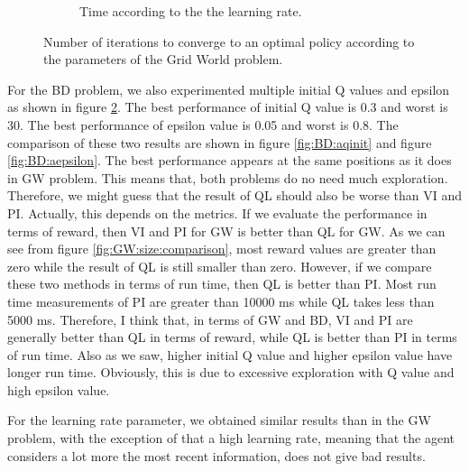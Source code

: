 \documentclass[10pt, twocolumn]{article}
\begin{document}
\begin{figure}[]
\begin{subfigure}[t]{0.49\textwidth}
					\caption{Time according to the the learning rate.}
					\label{fig:BD:rate}
				\end{subfigure}
				\caption{Number of iterations to converge to an optimal policy according to the parameters of the Grid World problem.}
				\label{fig:BD:QL}
			\end{figure}

			For the BD problem, we also experimented multiple initial Q values and epsilon as shown in figure \ref{fig:BD:QL}. The best performance of initial Q value is 0.3 and worst is 30. The best performance of epsilon value is 0.05 and worst is 0.8. The comparison of these two results are shown in figure \ref{fig:BD:aqinit} and figure \ref{fig:BD:aepsilon}. The best performance appears at the same positions as it does in GW problem. This means that, both problems do no need much exploration. Therefore, we might guess that the result of QL should also be worse than VI and PI. Actually, this depends on the metrics. If we evaluate the performance in terms of reward, then VI and PI for GW is better than QL for GW. As we can see from figure \ref{fig:GW:size:comparison}, most reward values are greater than zero while the result of QL is still smaller than zero. However, if we compare these two methods in terms of run time, then QL is better than PI. Most run time measurements of PI are greater than 10000 ms while QL takes less than 5000 ms. Therefore, I think that, in terms of GW and BD, VI and PI are generally better than QL in terms of reward, while QL is better than PI in terms of run time. Also as we saw, higher initial Q value and higher epsilon value have longer run time. Obviously, this is due to excessive exploration with Q value and high epsilon value.

			For the learning rate parameter, we obtained similar results than in the GW problem, with the exception of that a high learning rate, meaning that the agent considers a lot more the most recent information, does not give bad results.
\end{document}
